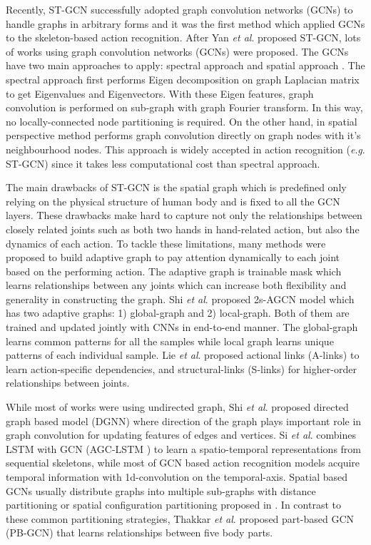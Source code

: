 \documentclass[runningheads]{llncs}
\newcommand{\etal}{\textit{et al}. }
\newcommand{\eg}{\textit{e}.\textit{g}. }
\begin{document}
Recently, ST-GCN \cite{yan2018spatial} successfully adopted graph convolution networks (GCNs) to handle graphs in arbitrary forms and it was the first method which applied GCNs to the skeleton-based action recognition. After Yan \etal \cite{yan2018spatial} proposed ST-GCN, lots of works using graph convolution networks (GCNs) were proposed. The GCNs have two main approaches to apply: spectral approach \cite{li2018spatio} and spatial approach \cite{shi2019two,shi2019skeleton,li2019actional,si2019attention}. The spectral approach first performs Eigen decomposition on graph Laplacian matrix to get Eigenvalues and Eigenvectors. With these Eigen features, graph convolution is performed on sub-graph with graph Fourier transform. In this way, no locally-connected node partitioning is required. On the other hand, in spatial perspective method performs graph convolution directly on graph nodes with it's neighbourhood nodes. This approach is widely accepted in action recognition (\eg ST-GCN) since it takes less computational cost than spectral approach. 

The main drawbacks of ST-GCN is the spatial graph which is predefined only relying on the physical structure of human body and is fixed to all the GCN layers. These drawbacks make hard to capture not only the relationships between closely related joints such as both two hands in hand-related action, but also the dynamics of each action. To tackle these limitations, many methods \cite{shi2019two,shi2019skeleton,song2019richly,li2019actional,si2019attention} were proposed to build adaptive graph to pay attention dynamically to each joint based on the performing action.  The adaptive graph is trainable mask which learns relationships between any joints which can increase both flexibility and generality in constructing the graph. Shi \etal \cite{shi2019two} proposed 2s-AGCN model which has two adaptive graphs: 1) global-graph and 2) local-graph. Both of them are trained and updated jointly with CNNs in end-to-end manner. The global-graph learns common patterns for all the samples while local graph learns unique patterns of each individual sample. Lie \etal \cite{li2019actional} proposed actional links (A-links) to learn action-specific dependencies, and structural-links (S-links) for higher-order relationships between joints. 

While most of works were using undirected graph, Shi \etal \cite{shi2019multi} proposed directed graph based model (DGNN) where direction of the graph plays important role in graph convolution for updating features of edges and vertices. Si \etal \cite{si2019attention} combines LSTM with GCN (AGC-LSTM ) to learn a spatio-temporal representations from sequential skeletons, while most of GCN based action recognition models acquire temporal information with 1d-convolution on the temporal-axis. Spatial based GCNs usually distribute graphs into multiple sub-graphs with distance partitioning or spatial configuration partitioning proposed in \cite{yan2018spatial}. In contrast to these common partitioning strategies, Thakkar \etal \cite{thakkar2018part} proposed part-based GCN (PB-GCN) that learns relationships between five body parts.
\end{document}
